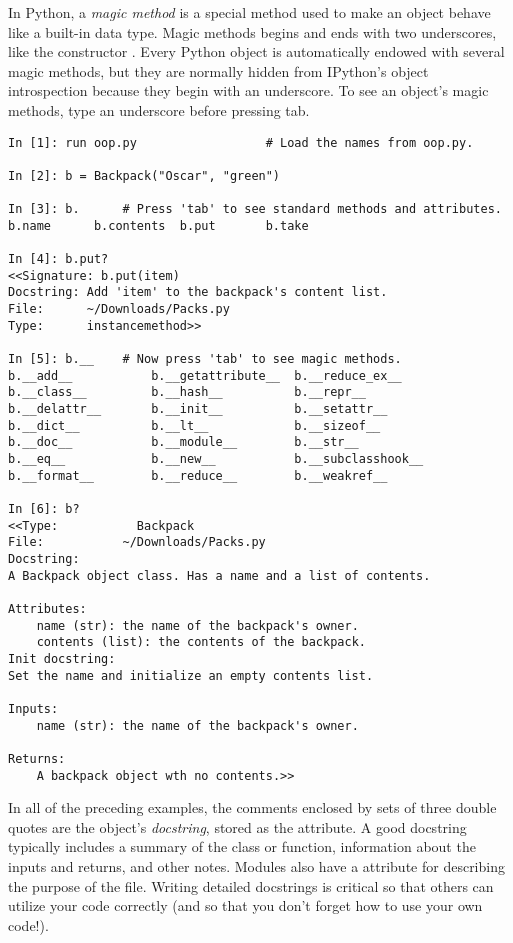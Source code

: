 In Python, a \emph{magic method} is a special method used to make an object behave like a built-in data type.
Magic methods begins and ends with two underscores, like the constructor .
Every Python object is automatically endowed with several magic methods, but they are normally hidden from IPython's object introspection because they begin with an underscore.
To see an object's magic methods, type an underscore before pressing tab.

\begin{lstlisting}
In [1]: run oop.py                  # Load the names from oop.py.

In [2]: b = Backpack("Oscar", "green")

In [3]: b.      # Press 'tab' to see standard methods and attributes.
b.name      b.contents  b.put       b.take

In [4]: b.put?
<<Signature: b.put(item)
Docstring: Add 'item' to the backpack's content list.
File:      ~/Downloads/Packs.py
Type:      instancemethod>>

In [5]: b.__	# Now press 'tab' to see magic methods.
b.__add__           b.__getattribute__  b.__reduce_ex__
b.__class__         b.__hash__          b.__repr__
b.__delattr__       b.__init__          b.__setattr__
b.__dict__          b.__lt__            b.__sizeof__
b.__doc__           b.__module__        b.__str__
b.__eq__            b.__new__           b.__subclasshook__
b.__format__        b.__reduce__        b.__weakref__

In [6]: b?
<<Type:           Backpack
File:           ~/Downloads/Packs.py
Docstring:
A Backpack object class. Has a name and a list of contents.

Attributes:
    name (str): the name of the backpack's owner.
    contents (list): the contents of the backpack.
Init docstring:
Set the name and initialize an empty contents list.

Inputs:
    name (str): the name of the backpack's owner.

Returns:
    A backpack object wth no contents.>>
\end{lstlisting}

\begin{info}
In all of the preceding examples, the comments enclosed by sets of three double quotes are the object's \emph{docstring}, stored as the  attribute.
A good docstring typically includes a summary of the class or function, information about the inputs and returns, and other notes.
Modules also have a  attribute for describing the purpose of the file.
Writing detailed docstrings is critical so that others can utilize your code correctly (and so that you don't forget how to use your own code!).
\end{info}

